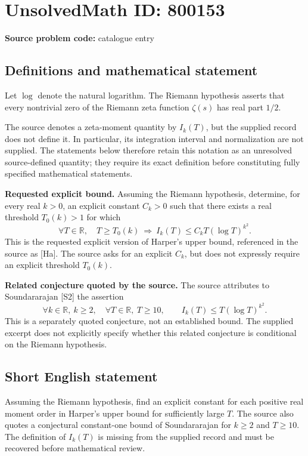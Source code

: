 \documentclass[11pt]{article}
\newcommand{\R}{\mathbb{R}}
\begin{document}
\section*{UnsolvedMath ID: 800153}
\textbf{Source problem code:} catalogue entry
\subsection{Definitions and mathematical statement}
Let \(\log\) denote the natural logarithm. The Riemann hypothesis asserts that every nontrivial zero of the Riemann zeta function \(\zeta(s)\) has real part \(1/2\).

The source denotes a zeta-moment quantity by \(I_k(T)\), but the supplied record does not define it. In particular, its integration interval and normalization are not supplied. The statements below therefore retain this notation as an unresolved source-defined quantity; they require its exact definition before constituting fully specified mathematical statements.

\textbf{Requested explicit bound.} Assuming the Riemann hypothesis, determine, for every real \(k>0\), an explicit constant \(C_k>0\) such that there exists a real threshold \(T_0(k)>1\) for which
\[
\forall T\in\R,\quad T\ge T_0(k)\ \Longrightarrow\ I_k(T)\le C_k T(\log T)^{k^2}.
\]
This is the requested explicit version of Harper's upper bound, referenced in the source as [Ha]. The source asks for an explicit \(C_k\), but does not expressly require an explicit threshold \(T_0(k)\).

\textbf{Related conjecture quoted by the source.} The source attributes to Soundararajan [S2] the assertion
\[
\forall k\in\R,\ k\ge2,\quad\forall T\in\R,\ T\ge10,\qquad
I_k(T)\le T(\log T)^{k^2}.
\]
This is a separately quoted conjecture, not an established bound. The supplied excerpt does not explicitly specify whether this related conjecture is conditional on the Riemann hypothesis.
\subsection{Short English statement}
Assuming the Riemann hypothesis, find an explicit constant for each positive real moment order in Harper's upper bound for sufficiently large \(T\). The source also quotes a conjectural constant-one bound of Soundararajan for \(k\ge2\) and \(T\ge10\). The definition of \(I_k(T)\) is missing from the supplied record and must be recovered before mathematical review.
\end{document}
